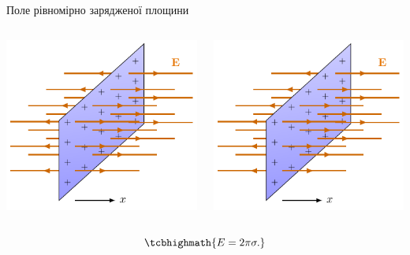\documentclass{beamer}
\begin{document}
\begin{frame}{Поле рівномірно зарядженої площини}{}
	\begin{columns}
		\begin{column}{0.5\linewidth}\centering
			\includegraphics[scale=1,page=1]{tikz/GaussExamples.pdf}
		\end{column}
		\begin{column}{0.5\linewidth}\centering
			\includegraphics[scale=1,page=2]{tikz/GaussExamples.pdf}
		\end{column}
	\end{columns}

	\begin{equation*}
		\tcbhighmath{
			E = 2\pi\sigma.
		}
	\end{equation*}

\end{frame}
\end{document}
